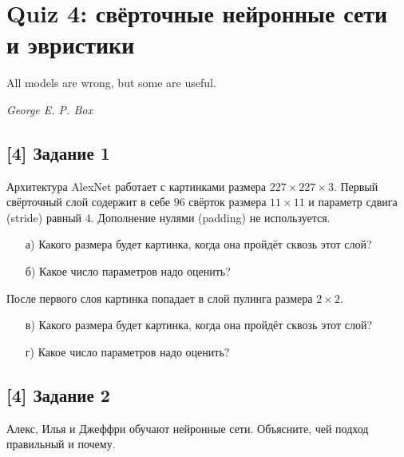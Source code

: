 \documentclass[12pt, a4paper, oneside]{article}
\begin{document}
\section*{Quiz 4: свёрточные нейронные сети и эвристики}

\epigraph{All models are wrong, but some are useful.}{\textit{George E. P. Box}}

\vspace{-0.5cm}
\subsection*{[4] Задание 1}
\vspace{-0.5cm}

Архитектура AlexNet работает с картинками размера $227 \times 227 \times 3$.  Первый свёрточный слой содержит в себе $96$ свёрток размера $11 \times 11$ и параметр сдвига (stride) равный $4$. Дополнение нулями (padding) не используется. 

\begin{enumerate} 
    \item[а)]  Какого размера будет картинка, когда она пройдёт сквозь этот слой?  
    
    
    \item[б)] Какое число параметров надо оценить?
\end{enumerate}

После первого слоя картинка попадает в слой пулинга размера $2 \times 2$. 
\begin{enumerate} 
    \item[в)]  Какого размера будет картинка, когда она пройдёт сквозь этот слой?  
    
    \item[г)] Какое число параметров надо оценить?
\end{enumerate}

\vspace{-0.5cm}
\subsection*{[4] Задание 2}
\vspace{-0.5cm}

Алекс, Илья и Джеффри обучают нейронные сети. Объясните, чей подход правильный и почему.
\end{document}
